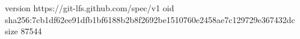 version https://git-lfs.github.com/spec/v1
oid sha256:7cb1df62ee91dfb1bf6188b2b8f2692be1510760e2458ae7c129729e367432dc
size 87544
